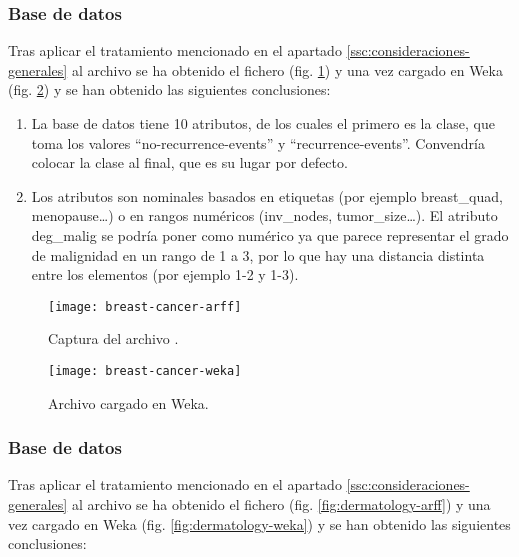 \subsubsection{Base de datos }
Tras aplicar el tratamiento mencionado en el apartado \ref{ssc:consideraciones-generales} al archivo  se ha obtenido el fichero  (fig. \ref{fig:breast-cancer-arff}) y una vez cargado en Weka (fig. \ref{fig:breast-cancer-weka}) y se han obtenido las siguientes conclusiones:

\begin{enumerate}
    \item La base de datos tiene 10 atributos, de los cuales el primero es la clase, que toma los valores ``no-recurrence-events'' y ``recurrence-events''. Convendría colocar la clase al final, que es su lugar por defecto.
    \item Los atributos son nominales basados en etiquetas (por ejemplo breast\_quad, menopause\dots) o en rangos numéricos (inv\_nodes, tumor\_size\dots). El atributo deg\_malig se podría poner como numérico ya que parece representar el grado de malignidad en un rango de 1 a 3, por lo que hay una distancia distinta entre los elementos (por ejemplo 1-2 y 1-3).
\end{enumerate}
\begin{figure}[ht]
    \centering
    \texttt{[image: breast-cancer-arff]}
    \caption{Captura del archivo .}
    \label{fig:breast-cancer-arff}
\end{figure}
\begin{figure}[ht]
    \centering
    \texttt{[image: breast-cancer-weka]}
    \caption{Archivo  cargado en Weka.}
    \label{fig:breast-cancer-weka}
\end{figure}

\subsubsection{Base de datos }
Tras aplicar el tratamiento mencionado en el apartado \ref{ssc:consideraciones-generales} al archivo  se ha obtenido el fichero  (fig. \ref{fig:dermatology-arff}) y una vez cargado en Weka (fig. \ref{fig:dermatology-weka}) y se han obtenido las siguientes conclusiones:

